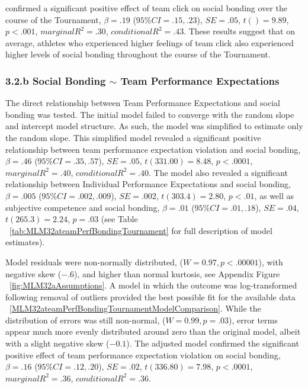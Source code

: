  confirmed a significant positive effect of team click on social bonding over the course of the Tournament, $\beta = .19$ ($95\% CI =  .15, .23$), $SE = .05$, $t() = 9.89$, $p < .001$, $marginal R^2 = .30$, $conditional R^2 = .43$.  These results suggest that on average, athletes who experienced higher feelings of team click also experienced higher levels of social bonding throughout the course of the Tournament.

 

 


\subsubsection{3.2.b Social Bonding $\sim$ Team Performance Expectations}
The direct relationship between Team Performance Expectations and social bonding was tested.  The initial model failed to converge with the random slope and intercept model structure.  As such, the model was simplified to estimate only the random slope. This simplified model revealed a significant positive relationship between team performance expectation violation and social bonding, $\beta = .46$ ($95\% CI =  .35, .57$), $SE = .05$, $t(331.00) = 8.48$, $p < .0001$, $marginal R^2 = .40$, $conditional R^2 = .40$.
The model also revealed a significant relationship between Individual Performance Expectations and social bonding, $\beta = .005$ ($95\% CI =  .002, .009$), $SE = .002$, $t(303.4) = 2.80$, $p < .01$, as well as subjective competence and social bonding, $\beta = .01$ ($95\% CI =  .01, .18$), $SE = .04$, $t(265.3) = 2.24$, $p = .03$ (see Table ~\ref{tab:MLM32ateamPerfBondingTournament} for full description of model estimates).

Model residuals were non-normally distributed, ($W = 0.97, p < .00001$), with negative skew ($-.6$), and higher than normal kurtosis, see Appendix Figure ~\ref{fig:MLM32aAssumptions}.  A model in which the outcome was log-transformed following removal of outliers provided the best possible fit for the available data ~\ref{MLM32ateamPerfBondingTournamentModelComparison}. While the distribution of errors was still non-normal, ($W = 0.99, p = .03$),  error terms appear much more evenly distributed around zero than the original model, albeit with a slight negative skew ($-0.1$).
The adjusted model confirmed the significant positive effect of team performance expectation violation on social bonding,  $\beta = .16$ ($95\% CI =  .12, .20$), $SE = .02$, $t(336.80) = 7.98$, $p < .0001$, $marginal R^2 = .36$, $conditional R^2 = .36$.



